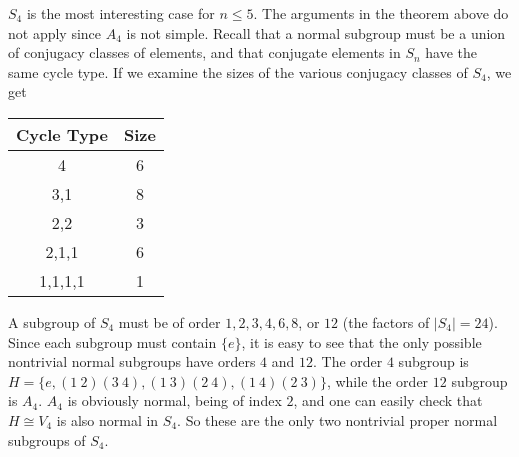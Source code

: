 \documentclass[12pt]{article}
\begin{document}
$S_4$ is the most interesting case for $n\leq 5$. The arguments in the theorem above do not apply since $A_4$ is not simple. Recall that a normal subgroup must be a union of conjugacy classes of elements, and that conjugate elements in $S_n$ have the same cycle type. If we examine the sizes of the various conjugacy classes of $S_4$, we get
\begin{center}
\begin{tabular}{c|c}
Cycle Type & Size\\
\hline
4 & 6\\
3,1 & 8\\
2,2 & 3\\
2,1,1 & 6\\
1,1,1,1 & 1
\end{tabular}
\end{center}
A subgroup of $S_4$ must be of order $1,2,3,4,6,8$, or $12$ (the factors of $\lvert S_4\rvert=24$). Since each subgroup must contain $\{e\}$, it is easy to see that the only possible nontrivial normal subgroups have orders $4$ and $12$. The order $4$ subgroup is $H=\{e,(1~2)(3~4),(1~3)(2~4),(1~4)(2~3)\}$, while the order $12$ subgroup is $A_4$. $A_4$ is obviously normal, being of index $2$, and one can easily check that $H\cong V_4$ is also normal in $S_4$. So these are the only two nontrivial proper normal subgroups of $S_4$.


\end{document}
